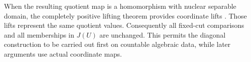 \begin{remark}\label{seq:lifts}
When the resulting quotient map is a homomorphism with nuclear
separable domain, the completely positive lifting theorem provides
\cpc coordinate lifts \cite[Theorem~3.10]{ChoiEffrosLifting}. Those lifts represent the
same quotient values. Consequently all fixed-cut comparisons and
all memberships in \(J(U)\) are unchanged. This permits the
diagonal construction to be carried out first on countable algebraic
data, while later arguments use actual \cpc coordinate maps.
\end{remark}
